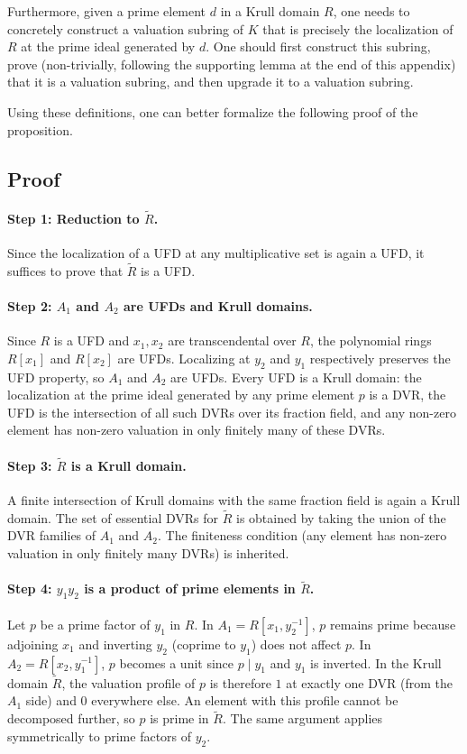 \documentclass[]{pkuai4m}
\theoremstyle{plain}
\theoremstyle{definition}
\begin{document}
Furthermore, given a prime element $d$ in a Krull domain $R$, one needs to concretely construct a valuation subring of $K$ that is precisely the localization of $R$ at the prime ideal generated by $d$. One should first construct this subring, prove (non-trivially, following the supporting lemma at the end of this appendix) that it is a valuation subring, and then upgrade it to a valuation subring.

Using these definitions, one can better formalize the following proof of the proposition.

\subsection*{Proof}

\paragraph{Step 1: Reduction to $\tilde{R}$.} Since the localization of a UFD at any multiplicative set is again a UFD, it suffices to prove that $\tilde{R}$ is a UFD.

\paragraph{Step 2: $A_1$ and $A_2$ are UFDs and Krull domains.} Since $R$ is a UFD and $x_1, x_2$ are transcendental over $R$, the polynomial rings $R[x_1]$ and $R[x_2]$ are UFDs. Localizing at $y_2$ and $y_1$ respectively preserves the UFD property, so $A_1$ and $A_2$ are UFDs. Every UFD is a Krull domain: the localization at the prime ideal generated by any prime element $p$ is a DVR, the UFD is the intersection of all such DVRs over its fraction field, and any non-zero element has non-zero valuation in only finitely many of these DVRs.

\paragraph{Step 3: $\tilde{R}$ is a Krull domain.} A finite intersection of Krull domains with the same fraction field is again a Krull domain. The set of essential DVRs for $\tilde{R}$ is obtained by taking the union of the DVR families of $A_1$ and $A_2$. The finiteness condition (any element has non-zero valuation in only finitely many DVRs) is inherited.

\paragraph{Step 4: $y_1 y_2$ is a product of prime elements in $\tilde{R}$.} Let $p$ be a prime factor of $y_1$ in $R$. In $A_1 = R[x_1, y_2^{-1}]$, $p$ remains prime because adjoining $x_1$ and inverting $y_2$ (coprime to $y_1$) does not affect $p$. In $A_2 = R[x_2, y_1^{-1}]$, $p$ becomes a unit since $p \mid y_1$ and $y_1$ is inverted. In the Krull domain $\tilde{R}$, the valuation profile of $p$ is therefore $1$ at exactly one DVR (from the $A_1$ side) and $0$ everywhere else. An element with this profile cannot be decomposed further, so $p$ is prime in $\tilde{R}$. The same argument applies symmetrically to prime factors of $y_2$.
\end{document}

